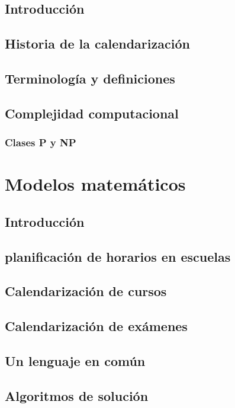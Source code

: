\documentclass[draft,12pt,headsepline,footsepline,paper=letter]{scrreprt}
\begin{document}
\section{Introducción}

\section{Historia de la calendarización}

\section{Terminología y definiciones}

\section{Complejidad computacional}

\subsection{Clases P y NP}

\chapter{Modelos matemáticos}

\section{Introducción}

\section{planificación de horarios en escuelas}

\section{Calendarización de cursos}

\section{Calendarización de exámenes}

\section{Un lenguaje en común}

\section{Algoritmos de solución}
\end{document}
